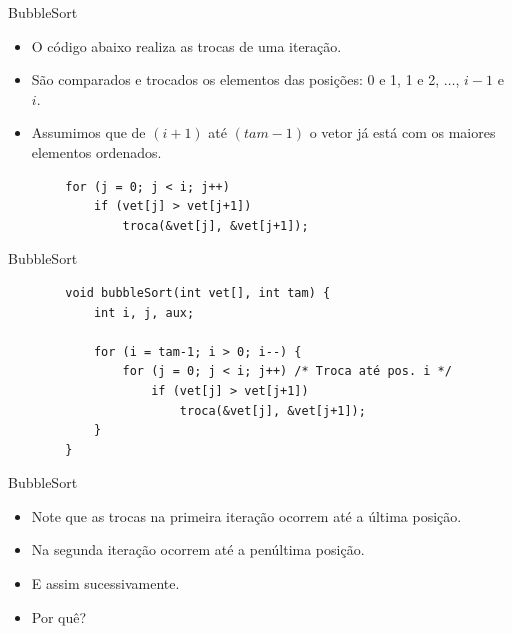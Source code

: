 \documentclass[handout]{beamer}
\begin{document}
\begin{frame}[fragile]{BubbleSort}

    \begin{itemize}
        \item O código abaixo realiza as trocas de uma iteração.
        \item São comparados e trocados os elementos das posições: 0 e 1, 1 e 2, $\ldots$, $i-1$ e $i$.
        \item Assumimos que de $(i+1)$ até $(tam-1)$ o vetor já está com os maiores elementos ordenados.
     \end{itemize}

     \begin{verbatim}
        for (j = 0; j < i; j++)
            if (vet[j] > vet[j+1])
                troca(&vet[j], &vet[j+1]);
    \end{verbatim}

\end{frame}

\begin{frame}[fragile]{BubbleSort}

    \begin{verbatim}
        void bubbleSort(int vet[], int tam) {
            int i, j, aux;

            for (i = tam-1; i > 0; i--) {
                for (j = 0; j < i; j++) /* Troca até pos. i */
                    if (vet[j] > vet[j+1])
                        troca(&vet[j], &vet[j+1]);
            }
        }
    \end{verbatim}

\end{frame}

\begin{frame}[fragile]{BubbleSort}

    \begin{itemize}
        \item Note que as trocas na primeira iteração ocorrem até a última posição.
        \item Na segunda iteração ocorrem até a penúltima posição.
        \item E assim sucessivamente.
        \item Por quê?
    \end{itemize}

\end{frame}

\end{document}
